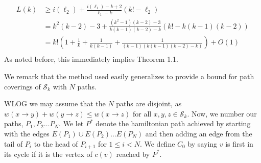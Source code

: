 \documentclass{article}
\newcommand{\hide}[1]{}
\newcommand{\dc}[1]{}%
\begin{document}
\begin{align*}
    L(k) &\geq i(\ell_2)+\frac{i(\ell_1)-k+2}{\ell_1-k}(k!-\ell_2)\\
    &= k^2(k-2) -3 +\frac{(k^2-1)(k-2)-3}{k(k-1)(k-2)-k}(k!-k(k-1)(k-2))\\
    &= k!\left(1 + \frac{1}{k}+\frac{1}{k(k-1)} + \frac{1}{(k-1)(k(k-1)(k-2)-k)} \right)+ O(1)\\
\end{align*}
As noted before, this immediately implies Theorem 1.1.

\hide{*The reason for this is that our bound pretends that in the interval $a_t +k < \ell \leq a_t + k(k-1)(k-2)$, $a_t = t(k(k-1)(k-2)-k)+k$, that we have a fixed initial cost $j(t)$, followed by a path $p_f$ of weight $i(\ell-a_t)$. Here, we find that letting $p_f$ be a 3-cycle is again optimal, which corresponds to letting $\ell$ take the largest value in the interval. The reason for why a 3-cycle is optimal here is roughly that it optimizes $w(p)/|p|$ for $k<|p|\leq k(k-1)(k-2)$, and then by properties of farey addition, it is the best way to optimize $\frac{j(t)+w(p)}{a_t+|p|}$.\dc{ Literally none of this reasoning makes sense given the machinery and terminology you have established so far. What is $j$? What is a 3-cycle? What is the meaning of ``optimal'' (or it is optimal compared to what)? What do you mean ``roughly''? What is farey (probably should be capitalized) addition? Why are we optimizing that particular quantity?}}

We remark that the method used easily generalizes to provide a bound for path coverings of $\mathcal{S}_k$ with $N$ paths. 

WLOG we may assume that the $N$ paths are disjoint, as $w(x\to y)+w(y\to z) \le w(x \to z)$ for all $x,y,z \in \mathcal{S}_k$. Now, we number our paths, $P_1,P_2\dots P_N$. We let $P^*$ denote the hamiltonian path achieved by starting with the edges $E(P_1) \cup E(P_2) \dots E(P_N)$ and then adding an edge from the tail of $P_i$ to the head of $P_{i+1}$ for $1\le i< N$. We define $C_0$ by saying $v$ is first in its cycle if it is the vertex of $c(v)$ reached by $P^*$.


\hide{
$\dagger$ We outline how we reached these conclusions. First, we by considered optimizing the intervals $t(k(k-1)(k-2)-k)+k < \ell \leq (t+1)(k(k-1)(k-2)-k)+k$, $t \geq 1$, according to our lower bound of $i$, and concluded that taking $\ell = (t+1)(k(k-1)(k-2)-k)+k$ was best. 

We then simply considered the interval up to $k(k-1)(k-2)$, finding that taking $\ell = k(k-1)(k-2)$ was best. Comparing to the optimal $\ell$'s in across intervals, we concluded that they all gave the same value. 

Finally, since our bound is tight along the interval up to $k(k-1)(k-2)$, we are able to remark equality for these two bounds. (meaning with the current reductions, this bound is tight, and cannot be improved)}
\end{document}
